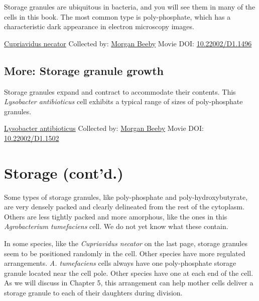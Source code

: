 \documentclass[]{tufte-book}
\begin{document}
Storage granules are ubiquitous in bacteria, and you will see them in many of the cells in this book. The most common type is poly-phosphate, which has a characteristic dark appearance in electron microscopy images.



\hypertarget{htmlwidget-93a2cad9dc4ea9fbb580}{}

\label{fig:4-8}\protect\hyperlink{tree}{Cupriavidus necator} Collected by: \protect\hyperlink{morgan_beeby}{Morgan Beeby} Movie DOI: \href{https://doi.org/10.22002/D1.1496}{10.22002/D1.1496}

\hypertarget{Storage_granule_growth}{%
\subsection*{More: Storage granule growth}\label{Storage_granule_growth}}

Storage granules expand and contract to accommodate their contents. This \emph{Lysobacter antibioticus} cell exhibits a typical range of sizes of poly-phosphate granules.



\hypertarget{htmlwidget-4e6ed0a71a05bdd664c7}{}

\label{fig:4-8a}\protect\hyperlink{tree}{Lysobacter antibioticus} Collected by: \protect\hyperlink{morgan_beeby}{Morgan Beeby} Movie DOI: \href{https://doi.org/10.22002/D1.1502}{10.22002/D1.1502}

\hypertarget{storage-contd.}{%
\section{Storage (cont'd.)}\label{storage-contd.}}

Some types of storage granules, like poly-phosphate and poly-hydroxybutyrate, are very densely packed and clearly delineated from the rest of the cytoplasm. Others are less tightly packed and more amorphous, like the ones in this \emph{Agrobacterium tumefaciens} cell. We do not yet know what these contain.

In some species, like the \emph{Cupriavidus necator} on the last page, storage granules seem to be positioned randomly in the cell. Other species have more regulated arrangements. \emph{A. tumefaciens} cells always have one poly-phosphate storage granule located near the cell pole. Other species have one at each end of the cell. As we will discuss in Chapter 5, this arrangement can help mother cells deliver a storage granule to each of their daughters during division.
\end{document}
